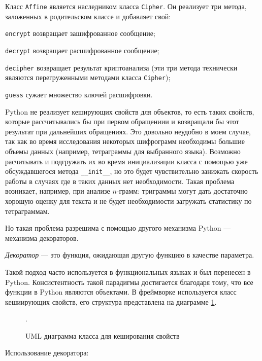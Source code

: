 Класс \texttt{Affine} является наследником класса \texttt{Cipher}.
Он реализует три метода, заложенных в родительском классе и 
добавляет свой:

\begin{trivlist}
\item \texttt{encrypt} возвращает зашифрованное сообщение;
\item \texttt{decrypt} возвращает расшифрованное сообщение;
\item \texttt{decipher} возвращает результат криптоанализа (эти три метода 
    технически являются перегруженными методами класса \texttt{Cipher});
\item \texttt{guess} сужает множество ключей расшифровки.
\end{trivlist}

Python не реализует кеширующих свойств для объектов, то есть 
таких свойств, которые рассчитывались бы при первом обращениии
и возвращали бы этот результат при дальнейших обращениях.
Это довольно неудобно в моем случае, так как во время 
исследования некоторых шифрограмм необходимы большие объемы данных 
(например, тетраграммы для выбранного языка). Возможно
расчитывать и подгружать их во время инициализации класса с 
помощью уже обсуждавшегося метода \texttt{\_\_init\_\_}, 
но это будет чувствительно занижать скорость работы 
в случаях где в таких данных нет необходимости.
Такая проблема возникает, например, при анализе 
$n$-грамм: триграммы могут дать достаточно хорошую
оценку для текста и не будет необходимости загружать 
статистику по тетраграммам.

Но такая проблема разрешима с помощью другого механизма
Python --- механизма декораторов.

\DEF\textit{Декоратор} --- это функция, ожидающая другую
функцию в качестве параметра.

Такой подход часто используется в функциональных языках
и был перенесен в Python. Консистентность такой парадигмы 
достигается благодаря тому, что все функции в Python
являются объектами.
В фреймворке используется класс кешиирующих свойств, его
структура представлена на диаграмме \ref{uml_cached}.

\begin{figure}[h]
\noindent{}
\caption{UML диаграмма класса для кеширования свойств}
\label{uml_cached}.
\end{figure}

Использование декоратора:

